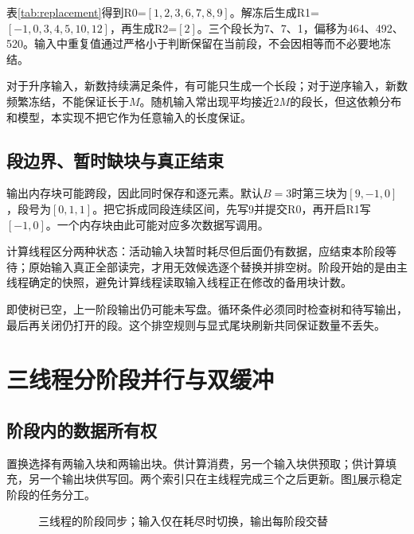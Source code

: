表\ref{tab:replacement}得到R0=$[1,2,3,6,7,8,9]$。解冻后生成R1=$[-1,0,3,4,5,10,12]$，再生成R2=$[2]$。三个段长为7、7、1，偏移为464、492、520。输入中重复值通过严格小于判断保留在当前段，不会因相等而不必要地冻结。

对于升序输入，新数持续满足条件，有可能只生成一个长段；对于逆序输入，新数频繁冻结，不能保证长于$M$。随机输入常出现平均接近$2M$的段长，但这依赖分布和模型，本实现不把它作为任意输入的长度保证。

\subsection{段边界、暂时缺块与真正结束}
输出内存块可能跨段，因此同时保存和逐元素。默认$B=3$时第三块为$[9,-1,0]$，段号为$[0,1,1]$。把它拆成同段连续区间，先写9并提交R0，再开启R1写$[-1,0]$。一个内存块由此可能对应多次数据写调用。

计算线程区分两种状态：活动输入块暂时耗尽但后面仍有数据，应结束本阶段等待；原始输入真正全部读完，才用无效候选逐个替换并排空树。阶段开始的是由主线程确定的快照，避免计算线程读取输入线程正在修改的备用块计数。

即使树已空，上一阶段输出仍可能未写盘。循环条件必须同时检查树和待写输出，最后再关闭仍打开的段。这个排空规则与显式尾块刷新共同保证数量不丢失。

\section{三线程分阶段并行与双缓冲}
\subsection{阶段内的数据所有权}
置换选择有两输入块和两输出块。供计算消费，另一个输入块供预取；供计算填充，另一个输出块供写回。两个索引只在主线程完成三个之后更新。图\ref{fig:stages}展示稳定阶段的任务分工。

\begin{figure}[htbp]\centering
{}\caption{三线程的阶段同步；输入仅在耗尽时切换，输出每阶段交替}\label{fig:stages}\end{figure}


